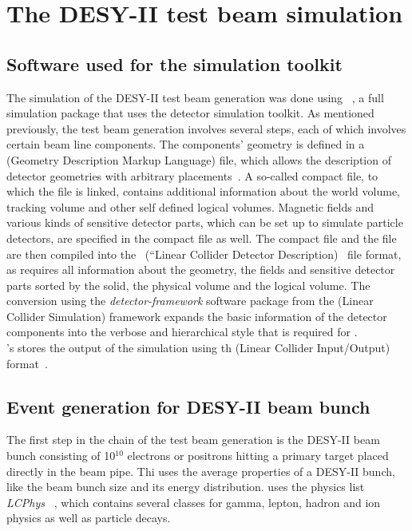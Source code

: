\section{The DESY-II test beam simulation}
\subsection{Software used for the simulation toolkit}
The simulation of the DESY-II test beam generation was done using 
\slic~\cite{Graf:2006ei,slic}, a full simulation package that uses the \geant \cite{Agostinelli2003250,1610988} detector 
simulation toolkit. As mentioned previously, the test beam generation involves  
several steps, each of which involves certain beam line components. The 
components' geometry is defined in a \gdml (Geometry Description Markup 
Language) file, which allows the description of detector geometries with 
arbitrary placements~\cite{gdml}. A so-called compact \xml file, to which the 
\gdml file is linked, contains additional information about the world volume, 
tracking volume and other self defined logical volumes. Magnetic fields and 
various kinds of sensitive detector parts, which can be set up to simulate 
particle detectors, are specified in the compact file as well. 
The \xml compact file and the \gdml file are then compiled into the  \lcdd~(``Linear Collider Detector Description)~\cite{McCormick:2005jc} file format, as \geant requires all 
information about the geometry, the fields and sensitive detector parts sorted 
by the solid, the physical volume and the logical volume. The conversion using 
the \textit{detector-framework} software package from the \lcsim (Linear Collider 
Simulation) framework expands the basic information of the detector components 
into the verbose and hierarchical style that is required for \geant. \\ \slic's 
stores the output of the simulation using th  \lcio (Linear Collider 
Input/Output) format~\cite{Aplin:2012kj,LCIO_DOC}.

\subsection{Event generation for DESY-II beam bunch}
The first step in the chain of the test beam generation is the DESY-II beam 
bunch consisting of 10$^{10}$ electrons or positrons hitting a primary target 
placed directly in the beam pipe. 
Thi uses the  average properties of a  DESY-II bunch, like the beam bunch size 
and its energy distribution.
\slic uses the \geant physics list \textit{LCPhys}~\cite{SLIC_LCPhys} 
, which contains several classes for gamma, lepton, hadron and 
ion physics as well as particle decays.

